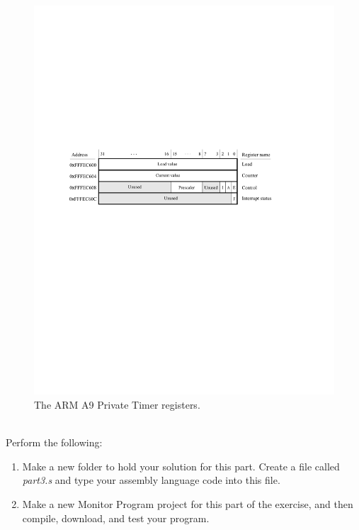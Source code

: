\documentclass[epsfig,10pt,fullpage]{article}
\begin{document}
~\\
\begin{figure}[htb]
	\begin{center}
	\includegraphics[scale=1]{figures/figuretimer.pdf}
	\end{center}
	\caption{The ARM A9 Private Timer registers.}
\label{fig:timer}
\end{figure}

~\\
\noindent
Perform the following:

\begin{enumerate}
\item Make a new folder to hold your solution for this part. Create a file called {\it part3.s} 
and type your assembly language code into this file.
\item Make a new Monitor Program project for this part of the exercise, and then compile, download, 
and test your program. 
\end{enumerate}
\end{document}
